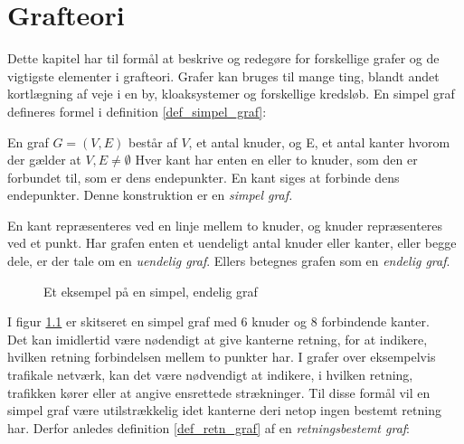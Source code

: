 \chapter{Grafteori}

Dette kapitel har til formål at beskrive og redegøre for forskellige grafer og de vigtigste elementer i grafteori. 
Grafer kan bruges til mange ting, blandt andet kortlægning af veje i en by, kloaksystemer og forskellige kredsløb.
En simpel graf defineres formel i definition \ref{def_simpel_graf}:


\begin{defn}
En graf $G = (V, E)$ består af $V$, et antal knuder, og E, et antal kanter hvorom der gælder at $V, E \neq \emptyset$
Hver kant har enten en eller to knuder, som den er forbundet til, som er dens endepunkter.
En kant siges at forbinde dens endepunkter. Denne konstruktion er en \it{simpel graf}.
\label{def_simpel_graf}
\end{defn}


\noindent En kant repræsenteres ved en linje mellem to knuder, og knuder repræsenteres ved et punkt. Har grafen enten et uendeligt antal knuder eller kanter, eller begge dele, er der tale om en \textit{uendelig graf}. Ellers betegnes grafen som en \textit{endelig graf}.


\begin{figure}[h]
\centering
{}
\caption{Et eksempel på en simpel, endelig graf} \label{simpel_graf}
\end{figure}


\noindent I figur \ref{simpel_graf} er skitseret en simpel graf med $6$ knuder og $8$ forbindende kanter. \\
Det kan imidlertid være nødendigt at give kanterne retning, for at indikere, hvilken retning forbindelsen mellem to punkter har. I grafer over eksempelvis trafikale netværk, kan det være nødvendigt at indikere, i hvilken retning, trafikken kører eller at angive ensrettede strækninger. Til disse formål vil en simpel graf være utilstrækkelig idet kanterne deri netop ingen bestemt retning har. Derfor anledes definition \ref{def_retn_graf} 
af en \textit{retningsbestemt graf}:

